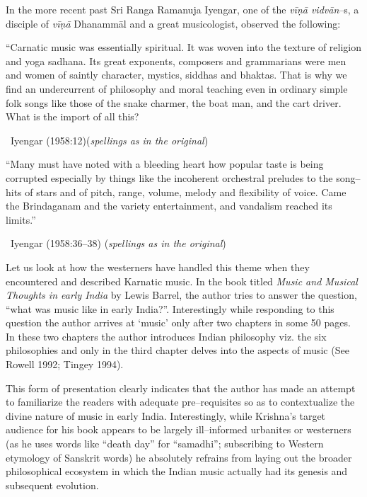 In the more recent past Sri Ranga Ramanuja Iyengar, one of the \textit{vīṇā vidvān}–s, a disciple of \textit{vīṇā} Dhanammāl and a great musicologist, observed the following:

\begin{myquote}
“Carnatic music was essentially spiritual. It was woven into the texture of religion and yoga sadhana. Its great exponents, composers and grammarians were men and women of saintly character, mystics, siddhas and bhaktas. That is why we find an undercurrent of philosophy and moral teaching even in ordinary simple folk songs like those of the snake charmer, the boat man, and the cart driver. What is the import of all this? 

~\hfill Iyengar (1958:12)(\textit{spellings as in the original})
\end{myquote}

\begin{myquote}
“Many must have noted with a bleeding heart how popular taste is being corrupted especially by things like the incoherent orchestral preludes to the song–hits of stars and of pitch, range, volume, melody and flexibility of voice. Came the Brindaganam and the variety entertainment, and vandalism reached its limits.” 

~\hfill Iyengar (1958:36–38) (\textit{spellings as in the original})
\end{myquote}

Let us look at how the westerners have handled this theme when they encountered and described Karnatic music. In the book titled \textit{Music and Musical Thoughts in early India} by Lewis Barrel, the author tries to answer the question, “what was music like in early India?”. Interestingly while responding to this question the author arrives at ‘music’ only after two chapters in some 50 pages. In these two chapters the author introduces Indian philosophy viz. the six philosophies and only in the third chapter delves into the aspects of music (See Rowell 1992; Tingey 1994).

This form of presentation clearly indicates that the author has made an attempt to familiarize the readers with adequate pre–requisites so as to contextualize the divine nature of music in early India. Interestingly, while Krishna’s target audience for his book appears to be largely ill–informed urbanites or westerners (as he uses words like “death day” for “samadhi”; subscribing to Western etymology of Sanskrit words) he absolutely refrains from laying out the broader philosophical ecosystem in which the Indian music actually had its genesis and subsequent evolution.

